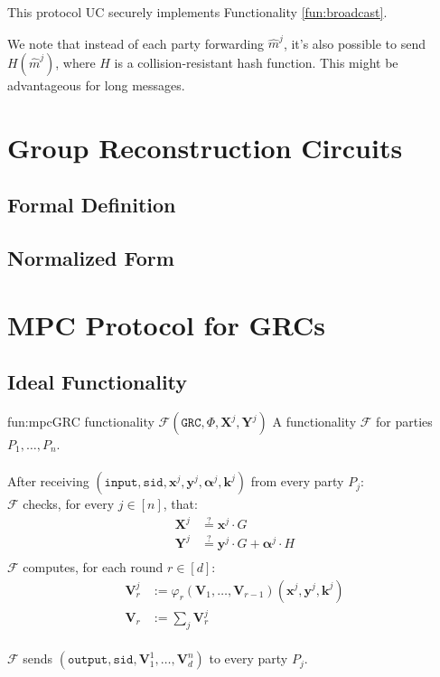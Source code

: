 This protocol UC securely implements Functionality \ref{fun:broadcast}.

We note that instead of each party forwarding $\hat{m}^j$, it's also possible
to send $H(\hat{m}^j)$, where $H$ is a collision-resistant hash function.
This might be advantageous for long messages.

\section{Group Reconstruction Circuits}

\subsection{Formal Definition}

\subsection{Normalized Form}

\section{MPC Protocol for GRCs}

\subsection{Ideal Functionality}

\begin{afunctionality}{fun:mpc}{GRC functionality $\mathcal{F}(\texttt{GRC}, \Phi, \textbf{X}^j, \textbf{Y}^j)$}
A functionality $\mathcal{F}$ for parties $P_1, \ldots, P_n$.\\
\\
After receiving
$(\texttt{input}, \texttt{sid}, \textbf{x}^j, \textbf{y}^j, \boldsymbol{\alpha}^j, \textbf{k}^j)$ from every party $P_j$:\\
$\mathcal{F}$ checks, for every $j \in [n]$, that:
$$
\begin{aligned}
    \textbf{X}^j &\stackrel{?}{=} \textbf{x}^j \cdot G\\
    \textbf{Y}^j &\stackrel{?}{=} \textbf{y}^j \cdot G + \boldsymbol{\alpha}^j \cdot H\\
\end{aligned}
$$
$\mathcal{F}$ computes, for each round $r \in [d]$:
$$
\begin{aligned}
    \textbf{V}^j_{r} &:= \varphi_{r}(\textbf{V}_{1}, \ldots, \textbf{V}_{r - 1})(
        \textbf{x}^j, \textbf{y}^j, \textbf{k}^j
    )\\
    \textbf{V}_r &:= \sum_j \textbf{V}^j_r
\end{aligned}
$$\\
$\mathcal{F}$ sends $(\texttt{output}, \texttt{sid}, \textbf{V}^1_1, \ldots, \textbf{V}^n_d)$ to every party $P_j$.
\end{afunctionality}

